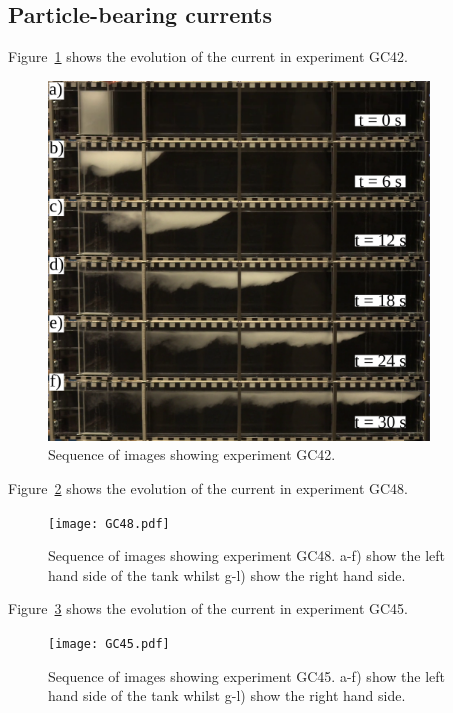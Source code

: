 \documentclass[authoryear,preprint,review,12pt]{elsarticle}
\begin{document}
\subsection{Particle-bearing currents}
\label{subsec:res_w_parts}

Figure~\ref{fig:GC42} shows the evolution of the current in experiment GC42.

\begin{figure}[ht!]
  \centerline{\includegraphics[width=0.9\textwidth]{GC42.pdf}}
  \caption{Sequence of images showing experiment GC42. }
  \label{fig:GC42}
\end{figure}

Figure~\ref{fig:GC48} shows the evolution of the current in experiment GC48.

\begin{figure}[ht!]
  \centerline{\texttt{[image: GC48.pdf]}}
  \caption{Sequence of images showing experiment GC48. a-f) show the left hand side of the tank whilst g-l) show the right hand side.}
  \label{fig:GC48}
\end{figure}

Figure~\ref{fig:GC45} shows the evolution of the current in experiment GC45.

\begin{figure}[ht!]
  \centerline{\texttt{[image: GC45.pdf]}}
  \caption{Sequence of images showing experiment GC45. a-f) show the left hand side of the tank whilst g-l) show the right hand side.}
  \label{fig:GC45}
\end{figure}
\end{document}
